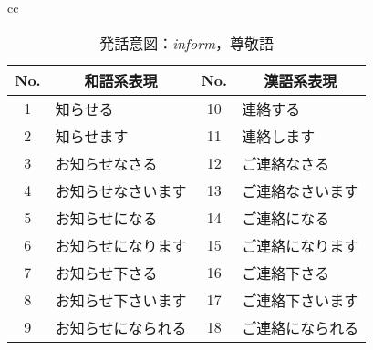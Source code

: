 \begin{table}[htbp]
\begin{center}
{\begin{tabular}{cc}
\begin{minipage}[t]{0.5\hsize}
\begin{center}
\caption{発話意図：{\it inform}，尊敬語} 
\label{tbl2:table3.2} 
\begin{tabular}{|c||l|c||l|} 
\hline 
No. & \multicolumn{1}{|c|}{和語系表現} & No. & \multicolumn{1}{|c|}{漢語系表現} \\
\hline 
1&	知らせる&			10&	連絡する \\
\hline 
2&	知らせます&		11&	連絡します\\
\hline 
3&	お知らせなさる&		12&	ご連絡なさる\\
\hline 
4&	お知らせなさいます&	13&	ご連絡なさいます\\
\hline 
5&	お知らせになる&		14&	ご連絡になる\\
\hline 
6&	お知らせになります&	15&	ご連絡になります\\
\hline 
7&	お知らせ下さる&		16&	ご連絡下さる\\
\hline 
8&	お知らせ下さいます&	17&	ご連絡下さいます\\
\hline 
9&	お知らせになられる&	18&	ご連絡になられる\\
\hline 
\end{tabular} 

\end{center}
\end{minipage}
\end{tabular}
}
\end{center}
\end{table} 

\vspace{-2.5\baselineskip} 


\addtocounter{appndnum}{1}
\setcounter{table}{0}

